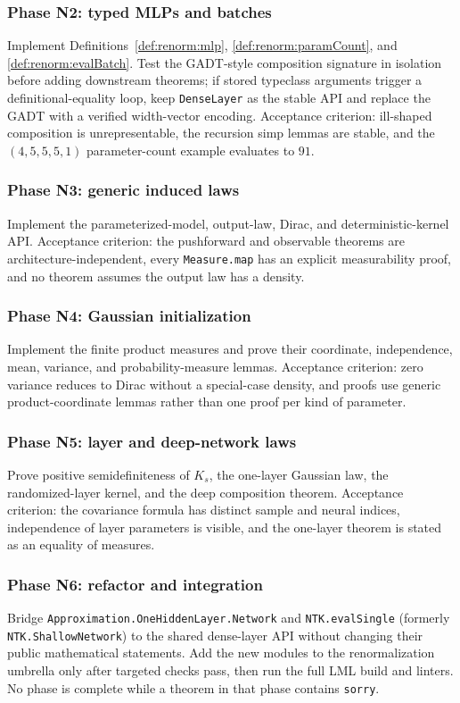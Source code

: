 \subsubsection*{Phase N2: typed MLPs and batches}
Implement Definitions~\ref{def:renorm:mlp}, \ref{def:renorm:paramCount}, and
\ref{def:renorm:evalBatch}.  Test the GADT-style composition signature in isolation before adding
downstream theorems; if stored typeclass arguments trigger a definitional-equality loop, keep
\texttt{DenseLayer} as the stable API and replace the GADT with a verified width-vector encoding.
Acceptance criterion: ill-shaped composition is unrepresentable, the recursion simp lemmas are
stable, and the $(4,5,5,5,1)$ parameter-count example evaluates to $91$.

\subsubsection*{Phase N3: generic induced laws}
Implement the parameterized-model, output-law, Dirac, and deterministic-kernel API.  Acceptance
criterion: the pushforward and observable theorems are architecture-independent, every
\texttt{Measure.map} has an explicit measurability proof, and no theorem assumes the output law has
a density.

\subsubsection*{Phase N4: Gaussian initialization}
Implement the finite product measures and prove their coordinate, independence, mean, variance,
and probability-measure lemmas.  Acceptance criterion: zero variance reduces to Dirac without a
special-case density, and proofs use generic product-coordinate lemmas rather than one proof per
kind of parameter.

\subsubsection*{Phase N5: layer and deep-network laws}
Prove positive semidefiniteness of $K_s$, the one-layer Gaussian law, the randomized-layer kernel,
and the deep composition theorem.  Acceptance criterion: the covariance formula has distinct
sample and neural indices, independence of layer parameters is visible, and the one-layer theorem
is stated as an equality of measures.

\subsubsection*{Phase N6: refactor and integration}
Bridge \texttt{Approximation.OneHiddenLayer.Network} and \texttt{NTK.evalSingle} (formerly \texttt{NTK.ShallowNetwork}) to the shared
dense-layer API without changing their public mathematical statements.  Add the new modules to the
renormalization umbrella only after targeted checks pass, then run the full LML build and linters.
No phase is complete while a theorem in that phase contains \texttt{sorry}.

